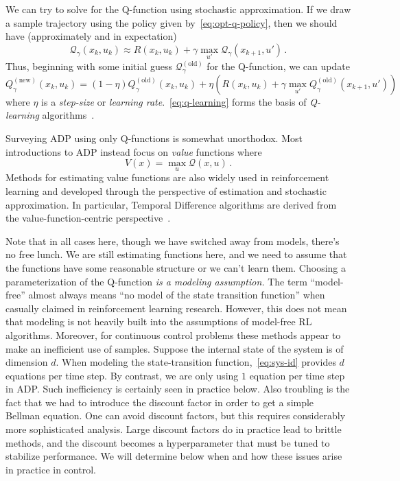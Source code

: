 \documentclass[11pt]{article}
\newcommand{\eq}[1]{\eqref{eq:#1}}
\numberwithin{equation}{section}
\begin{document}
We can try to solve for the Q-function using stochastic approximation. If we draw a sample trajectory using the policy given by~\eq{opt-q-policy}, then we should have (approximately and in expectation)
\[
	\mathcal{Q}_\gamma(x_k,u_k) \approx R(x_k,u_k) + \gamma \max_{u'} \mathcal{Q}_\gamma(x_{k+1},u')\,.
\]
Thus, beginning with some initial guess $\mathcal{Q}_\gamma^{(\mathrm{old})}$ for the Q-function, we can update
\begin{equation}\label{eq:q-learning}
	Q_\gamma^{(\mathrm{new})}(x_k,u_k) = (1-\eta) Q_\gamma^{(\mathrm{old})}(x_k,u_k) + \eta \left(R(x_k,u_k) + \gamma \max_{u'}  Q_\gamma^{(\mathrm{old})}(x_{k+1},u')\right)
\end{equation}
where $\eta$ is a \emph{step-size} or \emph{learning rate}.~\eq{q-learning} forms the basis of \emph{Q-learning} algorithms~\cite{tsitsiklis1994asynchronous,watkins1992q}.

Surveying ADP using only Q-functions is somewhat unorthodox. Most introductions to ADP instead  focus on \emph{value} functions where
\[
	V(x) = \max_u \mathcal{Q}(x,u)\,.
\]
Methods for estimating value functions are also widely used in reinforcement learning and developed through the perspective of estimation and stochastic approximation. In particular, Temporal Difference algorithms are derived from the value-function-centric perspective~\cite{sutton1988learning,dayan1992convergence,bradtke1996linear,bertsekas1996temporal,yu2009convergence}. 

Note that in all cases here, though we have switched away from models, there's no free lunch. We are still estimating functions here, and we need to assume that the functions have some reasonable structure or we can't learn them. Choosing a parameterization of the Q-function \emph{is a modeling assumption.} The term ``model-free'' almost always means ``no model of the state transition function'' when casually claimed in reinforcement learning research. However, this does not mean that modeling is not heavily built into the assumptions of model-free RL algorithms. Moreover, for continuous control problems these methods appear to make an inefficient use of samples. Suppose the internal state of the system is of dimension $d$. When modeling the state-transition function,~\eq{sys-id} provides $d$ equations per time step. By contrast, we are only using $1$ equation per time step in ADP. Such inefficiency is certainly seen in practice below. Also troubling is the fact that we had to introduce the discount factor in order to get a simple Bellman equation. One can avoid discount factors, but this requires considerably more sophisticated analysis. Large discount factors do in practice lead to brittle methods, and the discount becomes a hyperparameter that must be tuned to stabilize performance. We will determine below when and how these issues arise in practice in control.
\end{document}
